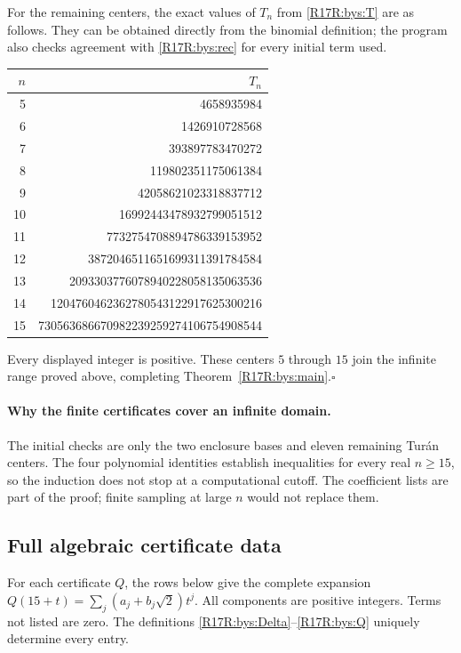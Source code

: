 \documentclass[11pt,a4paper]{article}
\begin{document}
For the remaining centers, the exact values of $T_n$ from
\eqref{R17R:bys:T} are as follows. They can be obtained directly from the
binomial definition; the program also checks agreement with
\eqref{R17R:bys:rec} for every initial term used.
\begin{center}
\begin{tabular}{rr}
\toprule
$n$ & $T_n$\\\midrule
5 & 4658935984\\
6 & 1426910728568\\
7 & 393897783470272\\
8 & 119802351175061384\\
9 & 42058621023318837712\\
10 & 16992443478932799051512\\
11 & 7732754708894786339153952\\
12 & 3872046511651699311391784584\\
13 & 2093303776078940228058135063536\\
14 & 1204760462362780543122917625300216\\
15 & 730563686670982239259274106754908544\\
\bottomrule
\end{tabular}
\end{center}
Every displayed integer is positive. These centers $5$ through $15$
join the infinite range proved above, completing
Theorem~\ref{R17R:bys:main}.\hfill$\square$

\paragraph{Why the finite certificates cover an infinite domain.}
The initial checks are only the two enclosure bases and eleven
remaining Tur\'an centers. The four polynomial identities establish
inequalities for every real $n\ge15$, so the induction does not stop at
a computational cutoff. The coefficient lists are part of the proof;
finite sampling at large $n$ would not replace them.


\subsection{Full algebraic certificate data}\label{R17R:bys:data}
For each certificate $Q$, the rows below give the complete expansion
$Q(15+t)=\sum_j(a_j+b_j\sqrt2)t^j$. All components are positive
integers. Terms not listed are zero. The definitions
\eqref{R17R:bys:Delta}--\eqref{R17R:bys:Q} uniquely determine every entry.
\end{document}
